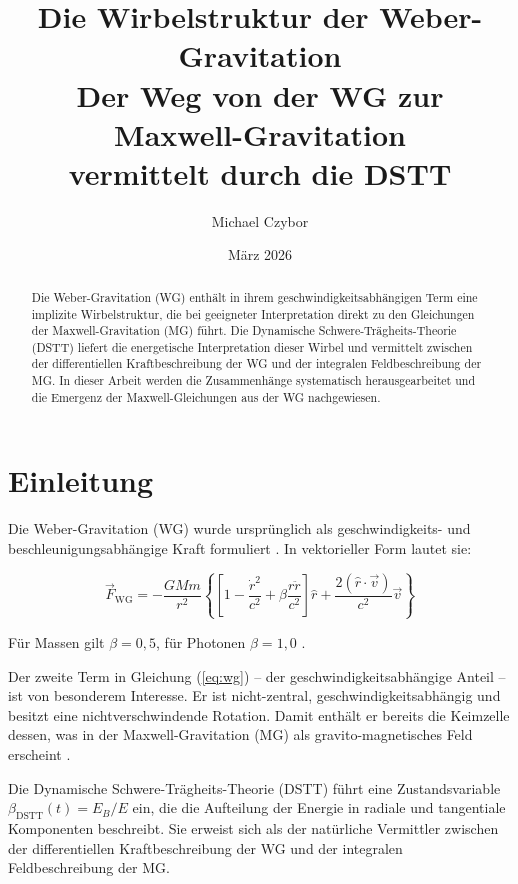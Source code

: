 \documentclass[12pt,a4paper]{article}
\title{\textbf{Die Wirbelstruktur der Weber-Gravitation} \\
Der Weg von der WG zur Maxwell-Gravitation \\
vermittelt durch die DSTT}
\author{Michael Czybor}
\date{März 2026}
\begin{document}
\maketitle

\begin{abstract}
Die Weber-Gravitation (WG) enthält in ihrem geschwindigkeitsabhängigen Term eine implizite Wirbelstruktur, die bei geeigneter Interpretation direkt zu den Gleichungen der Maxwell-Gravitation (MG) führt. Die Dynamische Schwere-Trägheits-Theorie (DSTT) liefert die energetische Interpretation dieser Wirbel und vermittelt zwischen der differentiellen Kraftbeschreibung der WG und der integralen Feldbeschreibung der MG. In dieser Arbeit werden die Zusammenhänge systematisch herausgearbeitet und die Emergenz der Maxwell-Gleichungen aus der WG nachgewiesen.
\end{abstract}

\tableofcontents
\newpage

\section{Einleitung}

Die Weber-Gravitation (WG) wurde ursprünglich als geschwindigkeits- und beschleunigungsabhängige Kraft formuliert \cite{weber1846, assis1994}. In vektorieller Form lautet sie:

\begin{equation}
\vec{F}_{\text{WG}} = -\frac{GMm}{r^2} \left\{ \left[1 - \frac{\dot{r}^2}{c^2} + \beta\frac{r\ddot{r}}{c^2}\right] \hat{r} + \frac{2(\hat{r}\cdot\vec{v})}{c^2}\vec{v} \right\}
\label{eq:wg}
\end{equation}

Für Massen gilt \(\beta = 0,5\), für Photonen \(\beta = 1,0\) \cite{czybor2025a}.

Der zweite Term in Gleichung (\ref{eq:wg}) – der geschwindigkeitsabhängige Anteil – ist von besonderem Interesse. Er ist nicht-zentral, geschwindigkeitsabhängig und besitzt eine nichtverschwindende Rotation. Damit enthält er bereits die Keimzelle dessen, was in der Maxwell-Gravitation (MG) als gravito-magnetisches Feld erscheint \cite{czybor2025b}.

Die Dynamische Schwere-Trägheits-Theorie (DSTT) \cite{czybor2025c} führt eine Zustandsvariable \(\beta_{\text{DSTT}}(t) = E_B/E\) ein, die die Aufteilung der Energie in radiale und tangentiale Komponenten beschreibt. Sie erweist sich als der natürliche Vermittler zwischen der differentiellen Kraftbeschreibung der WG und der integralen Feldbeschreibung der MG.
\end{document}
